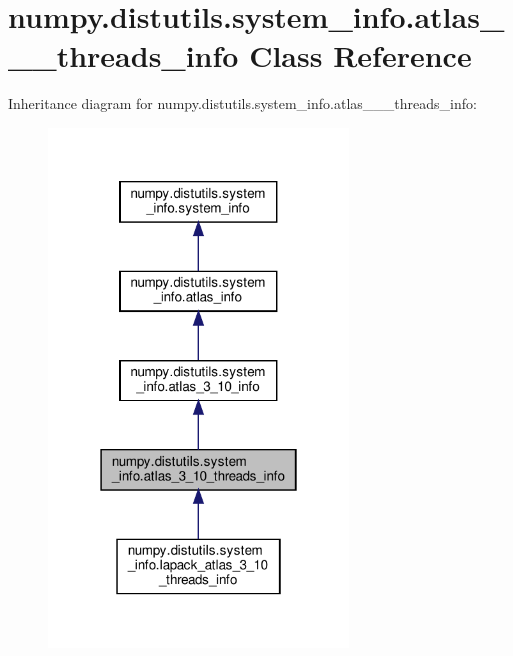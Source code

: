 \hypertarget{classnumpy_1_1distutils_1_1system__info_1_1atlas__3__10__threads__info}{}\section{numpy.\+distutils.\+system\+\_\+info.\+atlas\+\_\+\_\+\_\+threads\+\_\+info Class Reference}
\label{classnumpy_1_1distutils_1_1system__info_1_1atlas__3__10__threads__info}


Inheritance diagram for numpy.\+distutils.\+system\+\_\+info.\+atlas\+\_\+\_\+\_\+threads\+\_\+info\+:
\nopagebreak
\begin{figure}[H]
\begin{center}
\leavevmode
\includegraphics[width=226pt]{classnumpy_1_1distutils_1_1system__info_1_1atlas__3__10__threads__info__inherit__graph}
\end{center}
\end{figure}


